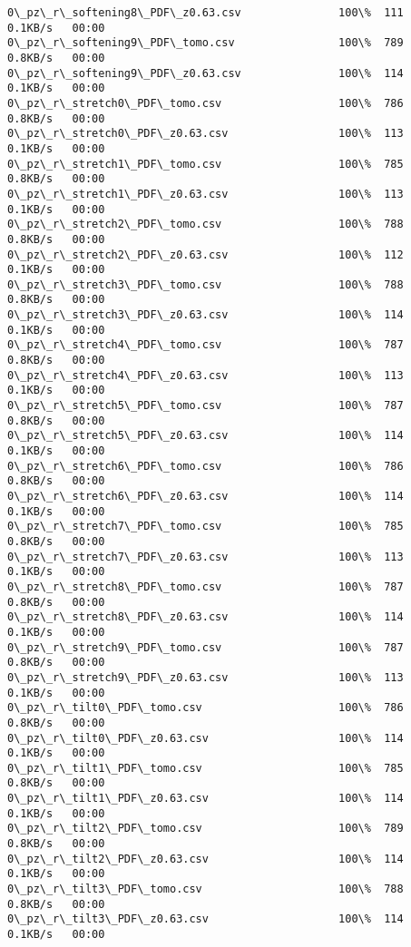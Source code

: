 \documentclass[11pt]{article}
\begin{document}
\begin{Verbatim}[commandchars=\\\{\}]
0\_pz\_r\_softening8\_PDF\_z0.63.csv               100\%  111     0.1KB/s   00:00    
0\_pz\_r\_softening9\_PDF\_tomo.csv                100\%  789     0.8KB/s   00:00    
0\_pz\_r\_softening9\_PDF\_z0.63.csv               100\%  114     0.1KB/s   00:00    
0\_pz\_r\_stretch0\_PDF\_tomo.csv                  100\%  786     0.8KB/s   00:00    
0\_pz\_r\_stretch0\_PDF\_z0.63.csv                 100\%  113     0.1KB/s   00:00    
0\_pz\_r\_stretch1\_PDF\_tomo.csv                  100\%  785     0.8KB/s   00:00    
0\_pz\_r\_stretch1\_PDF\_z0.63.csv                 100\%  113     0.1KB/s   00:00    
0\_pz\_r\_stretch2\_PDF\_tomo.csv                  100\%  788     0.8KB/s   00:00    
0\_pz\_r\_stretch2\_PDF\_z0.63.csv                 100\%  112     0.1KB/s   00:00    
0\_pz\_r\_stretch3\_PDF\_tomo.csv                  100\%  788     0.8KB/s   00:00    
0\_pz\_r\_stretch3\_PDF\_z0.63.csv                 100\%  114     0.1KB/s   00:00    
0\_pz\_r\_stretch4\_PDF\_tomo.csv                  100\%  787     0.8KB/s   00:00    
0\_pz\_r\_stretch4\_PDF\_z0.63.csv                 100\%  113     0.1KB/s   00:00    
0\_pz\_r\_stretch5\_PDF\_tomo.csv                  100\%  787     0.8KB/s   00:00    
0\_pz\_r\_stretch5\_PDF\_z0.63.csv                 100\%  114     0.1KB/s   00:00    
0\_pz\_r\_stretch6\_PDF\_tomo.csv                  100\%  786     0.8KB/s   00:00    
0\_pz\_r\_stretch6\_PDF\_z0.63.csv                 100\%  114     0.1KB/s   00:00    
0\_pz\_r\_stretch7\_PDF\_tomo.csv                  100\%  785     0.8KB/s   00:00    
0\_pz\_r\_stretch7\_PDF\_z0.63.csv                 100\%  113     0.1KB/s   00:00    
0\_pz\_r\_stretch8\_PDF\_tomo.csv                  100\%  787     0.8KB/s   00:00    
0\_pz\_r\_stretch8\_PDF\_z0.63.csv                 100\%  114     0.1KB/s   00:00    
0\_pz\_r\_stretch9\_PDF\_tomo.csv                  100\%  787     0.8KB/s   00:00    
0\_pz\_r\_stretch9\_PDF\_z0.63.csv                 100\%  113     0.1KB/s   00:00    
0\_pz\_r\_tilt0\_PDF\_tomo.csv                     100\%  786     0.8KB/s   00:00    
0\_pz\_r\_tilt0\_PDF\_z0.63.csv                    100\%  114     0.1KB/s   00:00    
0\_pz\_r\_tilt1\_PDF\_tomo.csv                     100\%  785     0.8KB/s   00:00    
0\_pz\_r\_tilt1\_PDF\_z0.63.csv                    100\%  114     0.1KB/s   00:00    
0\_pz\_r\_tilt2\_PDF\_tomo.csv                     100\%  789     0.8KB/s   00:00    
0\_pz\_r\_tilt2\_PDF\_z0.63.csv                    100\%  114     0.1KB/s   00:00    
0\_pz\_r\_tilt3\_PDF\_tomo.csv                     100\%  788     0.8KB/s   00:00    
0\_pz\_r\_tilt3\_PDF\_z0.63.csv                    100\%  114     0.1KB/s   00:00    

\end{Verbatim}
\end{document}
